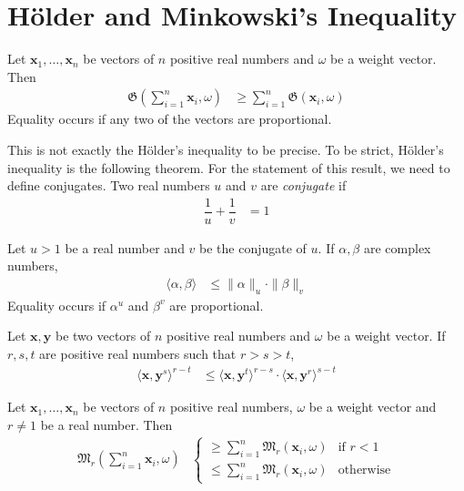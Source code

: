 \documentclass[inequalities.tex]{subfile}
\begin{document}
	
	\section{H\"{o}lder and Minkowski's Inequality}\label{sec:holdmink}
	
		\begin{theorem}\label{thm:holder}
			Let $\mathbf{x}_{1},\ldots,\mathbf{x}_{n}$ be vectors of $n$ positive real numbers and $\omega$ be a weight vector. Then
				\begin{align*}
					\mathfrak{G}\left(\sum_{i=1}^{n}\mathbf{x}_{i},\omega\right)
					& \geq \sum_{i=1}^{n}\mathfrak{G}(\mathbf{x}_{i},\omega)
				\end{align*}
			Equality occurs if any two of the vectors are proportional.
		\end{theorem}
	This is not exactly the H\"{o}lder's inequality to be precise. To be strict, H\"{o}lder's inequality is the following theorem. For the statement of this result, we need to define conjugates. Two real numbers $u$ and $v$ are \textit{conjugate} if
		\begin{align*}
			\dfrac{1}{u}+\dfrac{1}{v}
				& = 1
		\end{align*}
	
		\begin{theorem}
			Let $u>1$ be a real number and $v$ be the conjugate of $u$. If $\alpha,\beta$ are complex numbers,
				\begin{align*}
					\langle\alpha,\beta\rangle
						& \leq \|\alpha\|_{u}\cdot\|\beta\|_{v}
				\end{align*}
			Equality occurs if $\alpha^{u}$ and $\beta^{v}$ are proportional.
		\end{theorem}
	
		\begin{theorem}
			Let $\mathbf{x},\mathbf{y}$ be two vectors of $n$ positive real numbers and $\omega$ be a weight vector. If $r,s,t$ are positive real numbers such that $r>s>t$,
				\begin{align*}
					\langle\mathbf{x},\mathbf{y}^{s}\rangle^{r-t}
						& \leq \langle\mathbf{x},\mathbf{y}^{t}\rangle^{r-s}\cdot\langle\mathbf{x},\mathbf{y}^{r}\rangle^{s-t}
				\end{align*}
		\end{theorem}
	
		\begin{theorem}\label{thm:mink}
			Let $\mathbf{x}_{1},\ldots,\mathbf{x}_{n}$ be vectors of $n$ positive real numbers, $\omega$ be a weight vector and $r\neq1$ be a real number. Then
				\begin{align*}
					\mathfrak{M}_{r}\left(\sum_{i=1}^{n}\mathbf{x}_{i},\omega\right)
						&
							\begin{cases}
								\geq \sum_{i=1}^{n}\mathfrak{M}_{r}(\mathbf{x}_{i},\omega)& \mbox{if }r<1\\
								\leq \sum_{i=1}^{n}\mathfrak{M}_{r}(\mathbf{x}_{i}, \omega)& \mbox{otherwise}
							\end{cases}
				\end{align*}
		\end{theorem}
\end{document}
